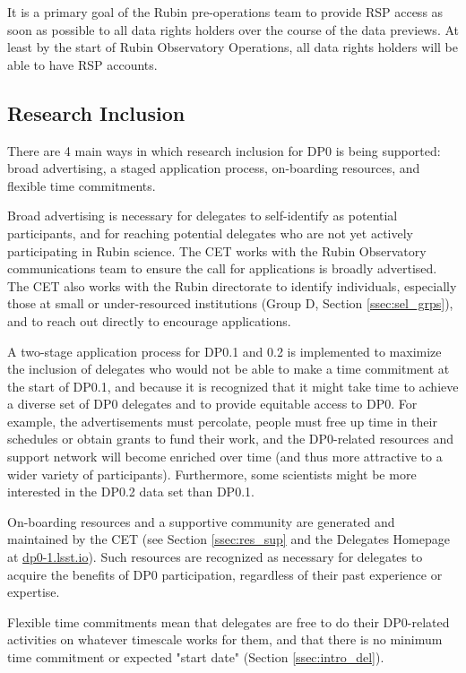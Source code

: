 \documentclass[DM,lsstdraft,authoryear,toc]{lsstdoc}
\begin{document}
It is a primary goal of the Rubin pre-operations team to provide RSP access as soon as possible to all data rights holders over the course of the data previews. 
At least by the start of Rubin Observatory Operations, all data rights holders will be able to have RSP accounts.


\subsection{Research Inclusion}\label{ssec:intro_RI}

There are 4 main ways in which research inclusion for DP0 is being supported: broad advertising, a staged application process, on-boarding resources, and flexible time commitments.

Broad advertising is necessary for delegates to self-identify as potential participants, and for reaching potential delegates who are not yet actively participating in Rubin science.
The CET works with the Rubin Observatory communications team to ensure the call for applications is broadly advertised. 
The CET also works with the Rubin directorate to identify individuals, especially those at small or under-resourced institutions (Group D, Section \ref{ssec:sel_grps}), and to reach out directly to encourage applications. 

A two-stage application process for DP0.1 and 0.2 is implemented to maximize the inclusion of delegates who would not be able to make a time commitment at the start of DP0.1, and because it is recognized that it might take time to achieve a diverse set of DP0 delegates and to provide equitable access to DP0.
For example, the advertisements must percolate, people must free up time in their schedules or obtain grants to fund their work, and the DP0-related resources and support network will become enriched over time (and thus more attractive to a wider variety of participants).
Furthermore, some scientists might be more interested in the DP0.2 data set than DP0.1.

On-boarding resources and a supportive community are generated and maintained by the CET (see Section \ref{ssec:res_sup} and the Delegates Homepage at \url{dp0-1.lsst.io}).
Such resources are recognized as necessary for delegates to acquire the benefits of DP0 participation, regardless of their past experience or expertise.

Flexible time commitments mean that delegates are free to do their DP0-related activities on whatever timescale works for them, and that there is no minimum time commitment or expected "start date" (Section \ref{ssec:intro_del}).
\end{document}
